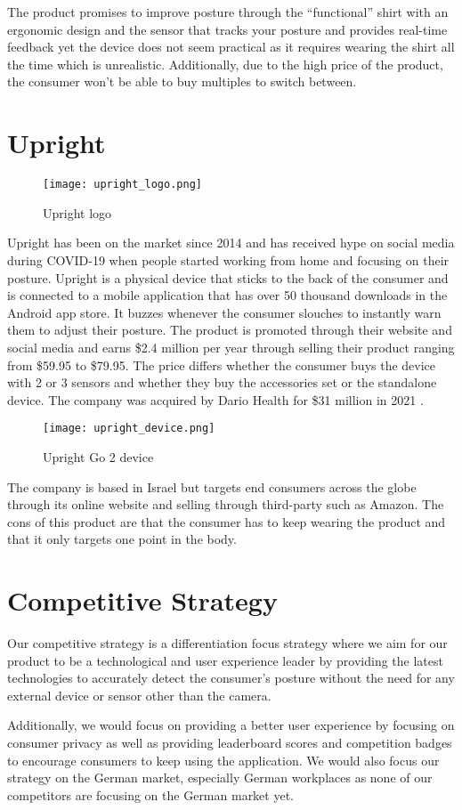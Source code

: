 The product promises to improve posture through the “functional” shirt with an ergonomic design and the sensor that tracks your posture and provides real-time feedback yet the device does not seem practical as it requires wearing the shirt all the time which is unrealistic. Additionally, due to the high price of the product, the consumer won't be able to buy multiples to switch between.

\section{Upright}

\begin{figure}[H]
    \centering
    \texttt{[image: upright\_logo.png]}
    \caption{Upright logo}
    \label{fig:upright_logo}
\end{figure}

Upright has been on the market since 2014 \cite{uprightpose} and has received hype on social media during COVID-19 when people started working from home and focusing on their posture.
Upright is a physical device that sticks to the back of the consumer and is connected to a mobile application that has over 50 thousand downloads in the Android app store.
It buzzes whenever the consumer slouches to instantly warn them to adjust their posture.
The product is promoted through their website and social media and earns \$2.4 million per year through selling their product \cite{upright_growjo} ranging from \$59.95 to \$79.95.
The price differs whether the consumer buys the device with 2 or 3 sensors and whether they buy the accessories set or the standalone device.
The company was acquired by Dario Health for \$31 million in 2021 \cite{dariohealth_acquisition}.

\begin{figure}[H]
    \centering
    \texttt{[image: upright\_device.png]}
    \caption{Upright Go 2 device}
    \label{fig:upright_device}
\end{figure}

The company is based in Israel but targets end consumers across the globe through its online website and selling through third-party such as Amazon. The cons of this product are that the consumer has to keep wearing the product and that it only targets one point in the body.

\section{Competitive Strategy}

Our competitive strategy is a differentiation focus strategy where we aim for our product to be a technological and user experience leader by providing the latest technologies to accurately detect the consumer's posture without the need for any external device or sensor other than the camera. 

Additionally, we would focus on providing a better user experience by focusing on consumer privacy as well as providing leaderboard scores and competition badges to encourage consumers to keep using the application. We would also focus our strategy on the German market, especially German workplaces as none of our competitors are focusing on the German market yet.